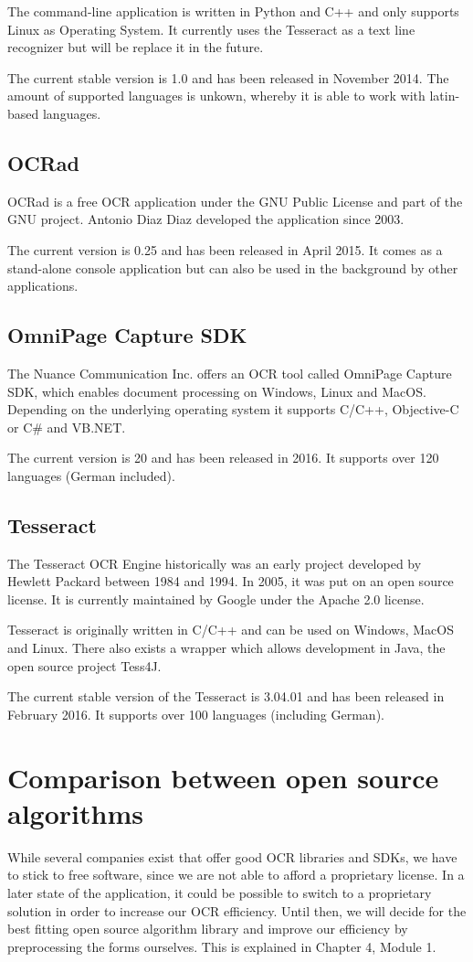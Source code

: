 The command-line application is written in Python and C++ and only supports Linux as Operating System. It currently uses the Tesseract as a text line recognizer but will be replace it in the future. 

The current stable version is 1.0 and has been released in November 2014. The amount of supported languages is unkown, whereby it is able to work with latin-based languages.

\label{OCRad}
\subsection{OCRad}
OCRad is a free OCR application under the GNU Public License and part of the GNU project. Antonio Diaz Diaz developed the application since 2003.

The current version is 0.25 and has been released in April 2015. It comes as a stand-alone console application but can also be used in the background by other applications.

\label{OmniPage}
\subsection{OmniPage Capture SDK}
The Nuance Communication Inc. offers an OCR tool called OmniPage Capture SDK, which enables document processing on Windows, Linux and MacOS. Depending on the underlying operating system it supports C/C++, Objective-C or C\# and VB.NET.

The current version is 20 and has been released in 2016. It supports over 120 languages (German included).

\label{Tesseract}
\subsection{Tesseract}
The Tesseract OCR Engine historically was an early project developed by Hewlett Packard between 1984 and 1994. In 2005, it was put on an open source license. It is currently maintained by Google under the Apache 2.0 license.

Tesseract is originally written in C/C++ and can be used on Windows, MacOS and Linux. There also exists a wrapper which allows development in Java, the open source project Tess4J.

The current stable version of the Tesseract is 3.04.01 and has been released in February 2016. It supports over 100 languages (including German). 

\label{OCRComparison}
\section{Comparison between open source algorithms}
While several companies exist that offer good OCR libraries and SDKs, we have to stick to free software, since we are not able to afford a proprietary license. In a later state of the application, it could be possible to switch to a proprietary solution in order to increase our OCR efficiency. Until then, we will decide for the best fitting open source algorithm library and improve our efficiency by preprocessing the forms ourselves. This is explained in Chapter 4, Module 1.

